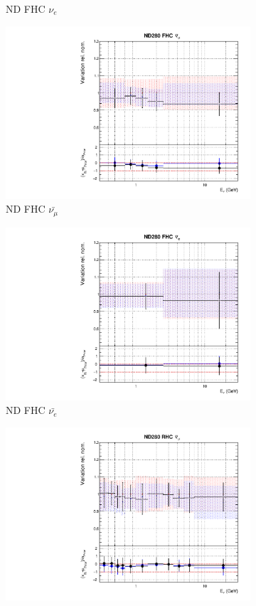 \begin{figure}[t]
\begin{subfigure}{0.24\textwidth}
  \caption{ND FHC $\nu_e$}
\end{subfigure}
\begin{subfigure}{0.24\textwidth}
  \centering
  \includegraphics[width=0.95\linewidth]{figs/rhcmpasmvflux2}
  \caption{ND FHC $\bar{\nu_{\mu}}$}
\end{subfigure}
\begin{subfigure}{0.24\textwidth}
  \centering
  \includegraphics[width=0.95\linewidth]{figs/rhcmpasmvflux3}
  \caption{ND FHC $\bar{\nu_{e}}$}
\end{subfigure}
\begin{subfigure}{0.24\textwidth}
  \centering
  \includegraphics[width=0.95\linewidth]{figs/rhcmpasmvflux4}

\end{subfigure}
\end{figure}
